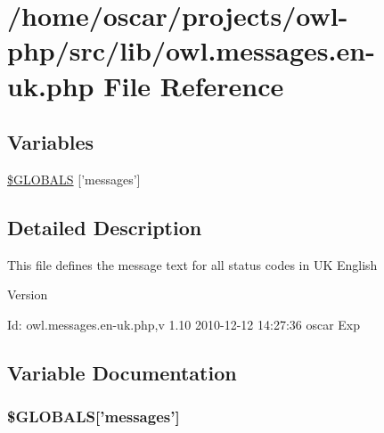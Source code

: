 \section{/home/oscar/projects/owl-\/php/src/lib/owl.messages.en-\/uk.php File Reference}
\label{owl_8messages_8en-uk_8php}
\subsection*{Variables}
\begin{DoxyCompactItemize}
\item 
\hyperlink{owl_8messages_8en-uk_8php_a65f2996116eed36e9ab25f254a470259}{\$GLOBALS} \mbox{[}'messages'\mbox{]}
\end{DoxyCompactItemize}


\subsection{Detailed Description}
This file defines the message text for all status codes in UK English \begin{DoxyVersion}{Version}

\end{DoxyVersion}
\begin{DoxyParagraph}{Id:}
owl.messages.en-\/uk.php,v 1.10 2010-\/12-\/12 14:27:36 oscar Exp 
\end{DoxyParagraph}


\subsection{Variable Documentation}
\subsubsection[{\$GLOBALS}]{\setlength{\rightskip}{0pt plus 5cm}\$GLOBALS\mbox{[}'messages'\mbox{]}}\label{owl_8messages_8en-uk_8php_a65f2996116eed36e9ab25f254a470259}
